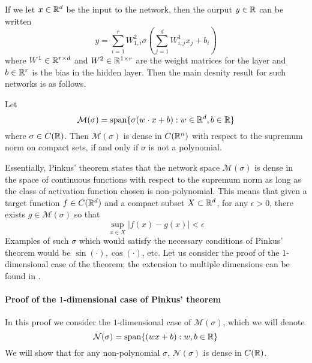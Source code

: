 If we let $x \in \mathbb{R}^d$ be the input to the network, then the ourput $y \in \mathbb{R}$ can be written
\begin{displaymath}
  y = \sum_{i=1}^r W_{1, i}^2 \sigma\left( \displaystyle\sum_{j=1}^{d}W_{i, j}^1 x_j + b_i\right)
\end{displaymath}
where $W^1 \in \mathbb{R}^{r \times d}$ and $W^2 \in \mathbb{R}^{1 \times r}$ are the weight matrices for the layer and $b \in \mathbb{R}^r$ is the bias in the hidden layer. Then the main desnity result for such networks is as follows. 
\begin{theorem}[Pinkus]
  Let
  \begin{displaymath}
    \mathcal{M}(\sigma) = \operatorname{span}\{ \sigma(w\cdot x + b): w \in \mathbb{R}^d, b \in \mathbb{R}\}
  \end{displaymath}
  where $\sigma \in C(\mathbb{R})$. Then $\mathcal{M}(\sigma)$ is dense in $C(\mathbb{R}^n)$ with respect to the supremum norm on compact sets, if and only if $\sigma$ is not a polynomial.
\end{theorem}
Essentially, Pinkus' theorem states that the network space $\mathcal{M}(\sigma)$ is dense in the space of continuous functions with respect to the supremum norm as long as the class of activation function chosen is non-polynomial. This means that given a target function $f \in C(\mathbb{R}^d)$ and a compact subset $X \subset \mathbb{R}^d$, for any $\epsilon > 0$, there exists $g \in \mathcal{M}(\sigma)$ so that 
\[ \sup_{x \in X} | f(x) - g(x) | < \epsilon \]
Examples of such $\sigma$ which would satisfy the necessary conditions of Pinkus' theorem would be $\sin(\cdot), \cos(\cdot)$, etc. Let us consider the proof of the $1$-dimensional case of the theorem; the extension to multiple dimensions can be found in \cite{surv}.

\paragraph{Proof of the $1$-dimensional case of Pinkus' theorem} In this proof we consider the $1$-dimensional case of $\mathcal{M}(\sigma)$, which we will denote
\[ \mathcal{N}(\sigma) = \operatorname{span}\{(wx+b): w, b \in \mathbb{R}\} \]
We will show that for any non-polynomial $\sigma$, $\mathcal{N}(\sigma)$ is dense in $C(\mathbb{R})$.
